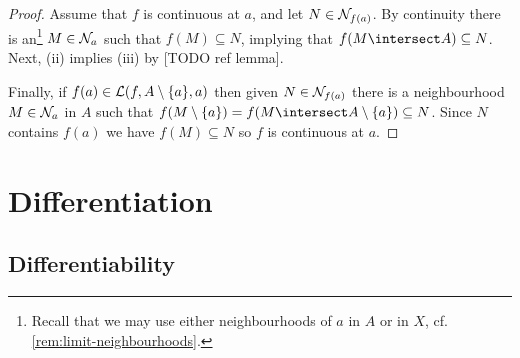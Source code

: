 \documentclass[article, a4paper, 11pt, oneside]{memoir}
\numberwithin{equation}{chapter}
\begin{document}
\begin{proof}
    Assume that $f$ is continuous at $a$, and let $N \in \mathcal{N}_{f(a)}$. By continuity there is an\footnote{Recall that we may use either neighbourhoods of $a$ in $A$ or in $X$, cf. \cref{rem:limit-neighbourhoods}.} $M \in \mathcal{N}_{a}$ such that $f(M) \subseteq N$, implying that $f(M \intersect A) \subseteq N$. Next, (ii) implies (iii) by [TODO ref lemma].
    
    Finally, if $f(a) \in \mathcal{L}(f, A \setminus \{a\}, a)$ then given $N \in \mathcal{N}_{f(a)}$ there is a neighbourhood $M \in \mathcal{N}_{a}$ in $A$ such that $f(M \setminus \{a\}) = f(M \intersect A \setminus \{a\}) \subseteq N$. Since $N$ contains $f(a)$ we have $f(M) \subseteq N$ so $f$ is continuous at $a$.
\end{proof}


\chapter{Differentiation}

\section{Differentiability}

    
\end{document}

